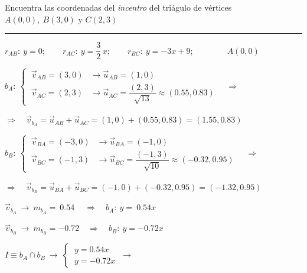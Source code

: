\vspace{5mm}
\begin{miejercicio}

Encuentra las coordenadas del \emph{incentro} del triágulo de vértices $A(0,0),\ B(3,0) \text{ y } C(2,3)$

\rule{250pt}{0.1pt}

\vspace{6mm} $r_{AB}:\ y=0;\qquad r_{AC}:\ y=\dfrac 3 2 \, x;\qquad r_{BC}:\ y=-3x+9;\qquad \qquad A(0,0)$

\vspace{4mm} $b_{A}:\ \begin{cases} \ \vec v_{AB}=(3,0) &\to \vec u_{AB}=(1,0) \\ \ \vec v_{AC}=(2,3) &\to \vec u_{AC}=\dfrac{(2,3)}{\sqrt{13}}\approx (0.55,0.83) \end{cases}  \quad \Rightarrow \ $

\vspace{2mm} \hspace{3cm} $\Rightarrow \quad  \vec v_{b_A}=\vec u_{AB}+\vec u_{AC}=(1,0)+(0.55,0.83)=(1.55,0.83)$

\vspace{2mm} $b_{B}:\ \begin{cases} \ \vec v_{BA}=(-3,0) &\to \vec u_{BA}=(-1,0) \\ \ \vec v_{BC}=(-1,3) &\to \vec u_{BC}=\dfrac{(-1,3)}{\sqrt{10}}\approx (-0.32,0.95) \end{cases}  \quad \Rightarrow \ $

\vspace{2mm} \hspace{3cm} $\Rightarrow \quad  \vec v_{b_B}=\vec u_{BA}+\vec u_{BC}=(-1,0)+(-0.32,0.95)=(-1.32,0.95)$

\vspace{2mm} 
\begin{multicols}{2}
\vspace{4mm} $\vec v_{b_A} \ \to \ m_{b_A}=\ 0.54 \quad \ \Rightarrow \quad b_A:\ y=\ 0.54x$

\vspace{6mm} $\vec v_{b_B} \ \to \ m_{b_B}=-0.72 \quad \Rightarrow \quad b_B:\ y=-0.72x$

\vspace{8mm} $I\equiv b_A \cap b_B \ \to \ \begin{cases} \ y=0.54 x\\ \ y=-0.72x \end{cases} \ \to \ $


\end{multicols}
\end{miejercicio}
